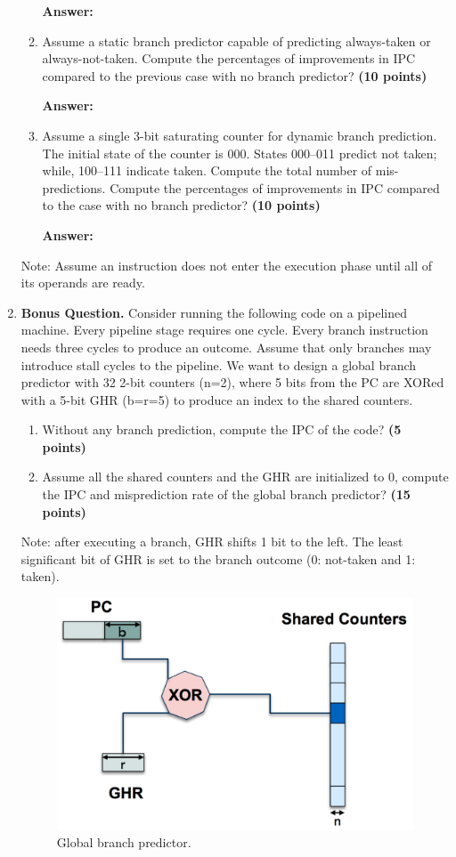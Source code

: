 \documentclass[a4paper, 11pt]{exam}
\begin{document}
\begin{center}
\begin{enumerate}
\begin{enumerate}
\hfill
 
\textbf{Answer:} 

\hfill

    \item  Assume a static branch predictor capable of predicting always-taken or always-not-taken. Compute the percentages of improvements in IPC compared to the previous case with no branch predictor? \textbf {(10 points)}
    
    \hfill
 
\textbf{Answer:} 

\hfill

   \item Assume a single 3-bit saturating counter for dynamic branch prediction. The initial state of the counter is 000. States 000--011 predict not taken; while, 100--111 indicate taken. Compute the total number of mis-predictions. Compute the percentages of improvements in IPC compared to the case with no branch predictor? \textbf {(10 points)}
   
   \hfill
 
\textbf{Answer:} 

\hfill

\end{enumerate}
Note: Assume an instruction does not enter the execution phase until all of its operands are ready.



\item \textbf{Bonus Question.}
Consider running the following code on a pipelined machine. Every pipeline stage requires one cycle. Every branch instruction needs three cycles to produce an outcome. Assume that only branches may introduce stall cycles to the pipeline.
We want to design a global branch predictor with 32 2-bit counters (n=2), where 5 bits from the PC are XORed with a 5-bit GHR (b=r=5) to produce an index to the shared counters.
\begin{enumerate}
	\item  Without any branch prediction, compute the IPC of the code? \textbf {(5 points)}
	\item  Assume all the shared counters and the GHR are initialized to 0, compute the IPC and misprediction rate of the global branch predictor? \textbf{(15 points)}
\end{enumerate}
Note: after executing a branch, GHR shifts 1 bit to the left. The least significant bit of GHR is set to the branch outcome (0: not-taken and 1: taken).

\begin{figure}[!h]
	\centering
	\includegraphics[width=0.5\linewidth]{q5}
	\caption{Global branch predictor.}
	\label{fig:q5}
\end{figure}



\end{enumerate}
\end{center}
\end{document}
